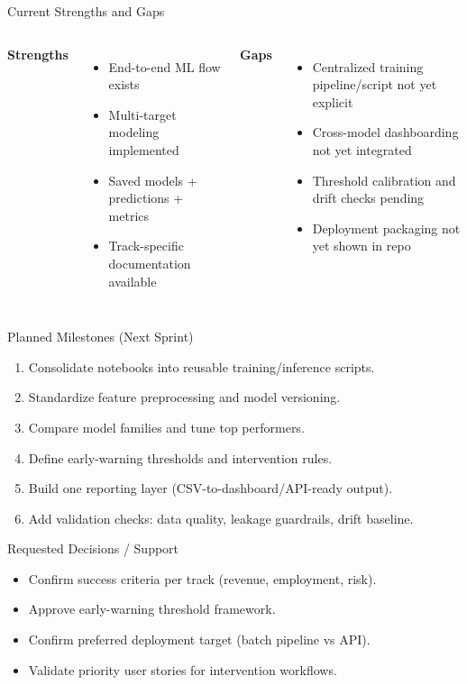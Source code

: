 \documentclass[10pt]{beamer}
\begin{document}
\begin{frame}{Current Strengths and Gaps}
\begin{columns}[T]
\textbf{Strengths}
\begin{itemize}
    \item End-to-end ML flow exists
    \item Multi-target modeling implemented
    \item Saved models + predictions + metrics
    \item Track-specific documentation available
\end{itemize}

\textbf{Gaps}
\begin{itemize}
    \item Centralized training pipeline/script not yet explicit
    \item Cross-model dashboarding not yet integrated
    \item Threshold calibration and drift checks pending
    \item Deployment packaging not yet shown in repo
\end{itemize}
\end{columns}
\end{frame}

\begin{frame}{Planned Milestones (Next Sprint)}
\begin{enumerate}
    \item Consolidate notebooks into reusable training/inference scripts.
    \item Standardize feature preprocessing and model versioning.
    \item Compare model families and tune top performers.
    \item Define early-warning thresholds and intervention rules.
    \item Build one reporting layer (CSV-to-dashboard/API-ready output).
    \item Add validation checks: data quality, leakage guardrails, drift baseline.
\end{enumerate}
\end{frame}

\begin{frame}{Requested Decisions / Support}
\begin{itemize}
    \item Confirm success criteria per track (revenue, employment, risk).
    \item Approve early-warning threshold framework.
    \item Confirm preferred deployment target (batch pipeline vs API).
    \item Validate priority user stories for intervention workflows.
\end{itemize}
\end{frame}
\end{document}

